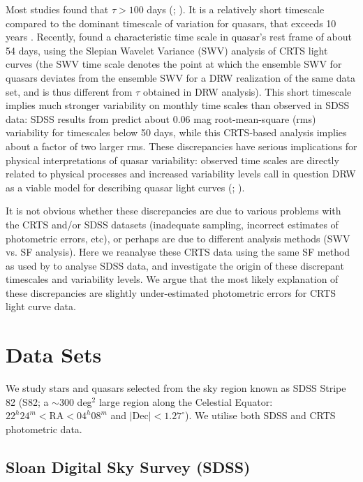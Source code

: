 \documentclass[fleqn,usenatbib]{mnras}
\begin{document}
Most studies found that $\tau > 100$ days (\citealt{macleod2010};  \citealt{kozlowski2016}). It is a relatively short timescale compared to the dominant timescale of variation for quasars, that exceeds 10 years \citep{hawkins2007}. Recently, \cite{graham2014} 
found a characteristic time scale in quasar's rest frame of about 54 days, using the Slepian Wavelet Variance (SWV) analysis
of CRTS light curves (the SWV time scale denotes the point at which the ensemble SWV for quasars deviates from
the ensemble SWV for a DRW  realization of the same data set, and is thus different from $\tau$ obtained in DRW analysis). 
This short timescale implies much stronger variability on monthly time scales than observed in SDSS 
data: SDSS results from \cite{macleod2010} predict about 0.06 mag root-mean-square (rms) variability for timescales below 
50 days, while this CRTS-based analysis implies about a factor of two larger rms. These discrepancies have serious
implications for physical interpretations of quasar variability: observed time scales are directly related to physical processes
and increased variability levels call in question DRW as a viable model for describing quasar light curves 
(\citealt{macleod2010};  \citealt{kozlowski2016}). 

It is not obvious whether these discrepancies are due to various problems with the CRTS and/or SDSS datasets
(inadequate sampling, incorrect estimates of photometric errors, etc), or perhaps are due to different analysis 
methods (SWV vs. SF analysis). Here we reanalyse these CRTS data using the same SF method as used by
\cite{macleod2010} to analyse SDSS data, and investigate the origin of these discrepant timescales and 
variability levels. We argue that the most likely explanation of these discrepancies are slightly under-estimated
photometric errors for CRTS light curve data. 


\section{Data Sets}

We study stars and quasars selected from the sky region known as SDSS Stripe 82 (S82; a $\sim$300 deg$^2$ large
region along the Celestial Equator: $22^{h} 24^{m} < \mathrm{RA} < 04^{h} 08^{m}$ and $\mathrm{| Dec |} < 1.27^\circ$). 
We utilise both SDSS and CRTS photometric data. 

\subsection{Sloan Digital Sky Survey (SDSS)}
\end{document}
